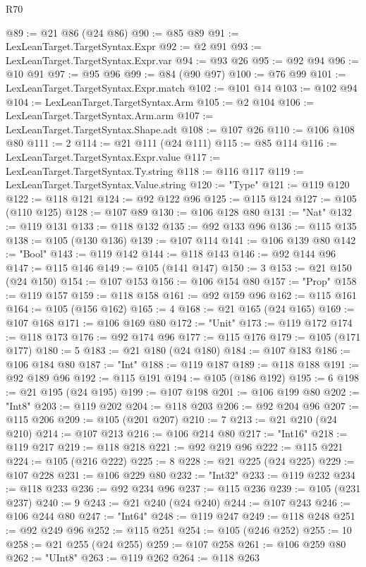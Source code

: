 \begin{lexlean}{R70}
\begin{coremodule}
@89 := @21 @86 (@24 @86)
@90 := @85 @89
@91 := LexLeanTarget.TargetSyntax.Expr
@92 := @2 @91
@93 := LexLeanTarget.TargetSyntax.Expr.var
@94 := @93 @26
@95 := @92 @94
@96 := @10 @91
@97 := @95 @96
@99 := @84 (@90 @97)
@100 := @76 @99
@101 := LexLeanTarget.TargetSyntax.Expr.match
@102 := @101 @14
@103 := @102 @94
@104 := LexLeanTarget.TargetSyntax.Arm
@105 := @2 @104
@106 := LexLeanTarget.TargetSyntax.Arm.arm
@107 := LexLeanTarget.TargetSyntax.Shape.adt
@108 := @107 @26
@110 := @106 @108 @80
@111 := 2
@114 := @21 @111 (@24 @111)
@115 := @85 @114
@116 := LexLeanTarget.TargetSyntax.Expr.value
@117 := LexLeanTarget.TargetSyntax.Ty.string
@118 := @116 @117
@119 := LexLeanTarget.TargetSyntax.Value.string
@120 := "Type"
@121 := @119 @120
@122 := @118 @121
@124 := @92 @122 @96
@125 := @115 @124
@127 := @105 (@110 @125)
@128 := @107 @89
@130 := @106 @128 @80
@131 := "Nat"
@132 := @119 @131
@133 := @118 @132
@135 := @92 @133 @96
@136 := @115 @135
@138 := @105 (@130 @136)
@139 := @107 @114
@141 := @106 @139 @80
@142 := "Bool"
@143 := @119 @142
@144 := @118 @143
@146 := @92 @144 @96
@147 := @115 @146
@149 := @105 (@141 @147)
@150 := 3
@153 := @21 @150 (@24 @150)
@154 := @107 @153
@156 := @106 @154 @80
@157 := "Prop"
@158 := @119 @157
@159 := @118 @158
@161 := @92 @159 @96
@162 := @115 @161
@164 := @105 (@156 @162)
@165 := 4
@168 := @21 @165 (@24 @165)
@169 := @107 @168
@171 := @106 @169 @80
@172 := "Unit"
@173 := @119 @172
@174 := @118 @173
@176 := @92 @174 @96
@177 := @115 @176
@179 := @105 (@171 @177)
@180 := 5
@183 := @21 @180 (@24 @180)
@184 := @107 @183
@186 := @106 @184 @80
@187 := "Int"
@188 := @119 @187
@189 := @118 @188
@191 := @92 @189 @96
@192 := @115 @191
@194 := @105 (@186 @192)
@195 := 6
@198 := @21 @195 (@24 @195)
@199 := @107 @198
@201 := @106 @199 @80
@202 := "Int8"
@203 := @119 @202
@204 := @118 @203
@206 := @92 @204 @96
@207 := @115 @206
@209 := @105 (@201 @207)
@210 := 7
@213 := @21 @210 (@24 @210)
@214 := @107 @213
@216 := @106 @214 @80
@217 := "Int16"
@218 := @119 @217
@219 := @118 @218
@221 := @92 @219 @96
@222 := @115 @221
@224 := @105 (@216 @222)
@225 := 8
@228 := @21 @225 (@24 @225)
@229 := @107 @228
@231 := @106 @229 @80
@232 := "Int32"
@233 := @119 @232
@234 := @118 @233
@236 := @92 @234 @96
@237 := @115 @236
@239 := @105 (@231 @237)
@240 := 9
@243 := @21 @240 (@24 @240)
@244 := @107 @243
@246 := @106 @244 @80
@247 := "Int64"
@248 := @119 @247
@249 := @118 @248
@251 := @92 @249 @96
@252 := @115 @251
@254 := @105 (@246 @252)
@255 := 10
@258 := @21 @255 (@24 @255)
@259 := @107 @258
@261 := @106 @259 @80
@262 := "UInt8"
@263 := @119 @262
@264 := @118 @263

\end{coremodule}
\end{lexlean}
